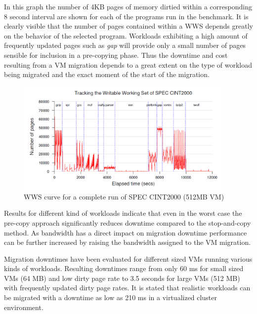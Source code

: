 In this graph the number of 4KB pages of memory dirtied within a corresponding 8 second interval are shown for each of the programs run in the benchmark. 
It is clearly visible that the number of pages contained within a WWS depends greatly on the behavior of the selected program. Workloads exhibiting a high amount of frequently updated pages such as \textit{gap} will provide only a small number of pages sensible for inclusion in a pre-copying phase. 
Thus the downtime and cost resulting from a VM migration depends to a great extent on the type of workload being migrated and the exact moment of the start of the migration. 



\begin{figure}
	\centering
		\includegraphics[width=0.94\textwidth]{figures/state_of_the_art/tracking_writable_working_set.PNG}
	\caption{WWS curve for a complete run of SPEC CINT2000 (512MB VM) \cite{clark2005live}}
	\label{fig:tracking_writable_working_set}
\end{figure}



Results for different kind of workloads indicate that even in the worst case the pre-copy approach significantly reduces downtime compared to the stop-and-copy method. As bandwidth has a direct impact on migration downtime performance can be further increased by raising the bandwidth assigned to the VM migration. 

Migration downtimes have been evaluated for different sized VMs running various kinds of workloads. Resulting downtimes range from only 60 ms for small sized VMs (64 MB) and low dirty page rate to 3.5 seconds for large VMs (512 MB) with frequently updated dirty page rates. It is stated that realistic workloads can be migrated with a downtime as low as 210 ms in a virtualized cluster environment. 


